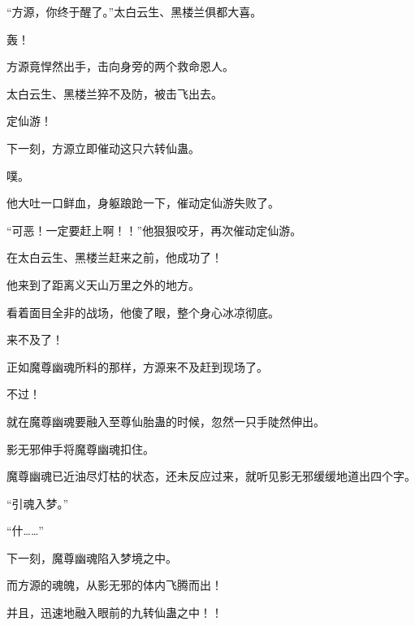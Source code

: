 \begin{this_body}
“方源，你终于醒了。”太白云生、黑楼兰俱都大喜。

轰！

方源竟悍然出手，击向身旁的两个救命恩人。

太白云生、黑楼兰猝不及防，被击飞出去。

定仙游！

下一刻，方源立即催动这只六转仙蛊。

噗。

他大吐一口鲜血，身躯踉跄一下，催动定仙游失败了。

“可恶！一定要赶上啊！！”他狠狠咬牙，再次催动定仙游。

在太白云生、黑楼兰赶来之前，他成功了！

他来到了距离义天山万里之外的地方。

看着面目全非的战场，他傻了眼，整个身心冰凉彻底。

来不及了！

正如魔尊幽魂所料的那样，方源来不及赶到现场了。

不过！

就在魔尊幽魂要融入至尊仙胎蛊的时候，忽然一只手陡然伸出。

影无邪伸手将魔尊幽魂扣住。

魔尊幽魂已近油尽灯枯的状态，还未反应过来，就听见影无邪缓缓地道出四个字。

“引魂入梦。”

“什……”

下一刻，魔尊幽魂陷入梦境之中。

而方源的魂魄，从影无邪的体内飞腾而出！

并且，迅速地融入眼前的九转仙蛊之中！！

\end{this_body}

